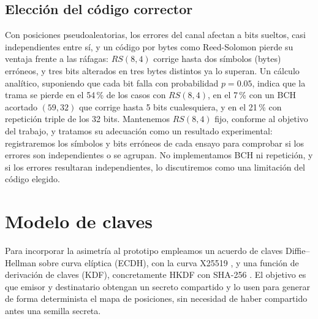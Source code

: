 \documentclass[IB]{TFUOC}%
\begin{document}
\subsection{Elección del código corrector}
\label{subsec:eleccion_codigo}

Con posiciones pseudoaleatorias, los errores del canal afectan a bits sueltos, casi independientes entre sí, y un código por bytes como Reed-Solomon pierde su ventaja frente a las ráfagas: $RS(8,4)$ corrige hasta dos símbolos (bytes) erróneos, y tres bits alterados en tres bytes distintos ya lo superan. Un cálculo analítico, suponiendo que cada bit falla con probabilidad $p=0{.}05$, indica que la trama se pierde en el 54\,\% de los casos con $RS(8,4)$, en el 7\,\% con un BCH acortado $(59,32)$ que corrige hasta 5 bits cualesquiera, y en el 21\,\% con repetición triple de los 32 bits. Mantenemos $RS(8,4)$ fijo, conforme al objetivo del trabajo, y tratamos su adecuación como un resultado experimental: registraremos los símbolos y bits erróneos de cada ensayo para comprobar si los errores son independientes o se agrupan. No implementamos BCH ni repetición, y si los errores resultaran independientes, lo discutiremos como una limitación del código elegido.


\section{Modelo de claves}
\label{sec:Modelo_Claves}

Para incorporar la asimetría al prototipo empleamos un acuerdo de claves Diffie--Hellman sobre curva elíptica (ECDH), con la curva X25519 \cite{rfc7748}, y una función de derivación de claves (KDF), concretamente HKDF con SHA-256 \cite{rfc5869}. El objetivo es que emisor y destinatario obtengan un secreto compartido y lo usen para generar de forma determinista el mapa de posiciones, sin necesidad de haber compartido antes una semilla secreta.
\end{document}
